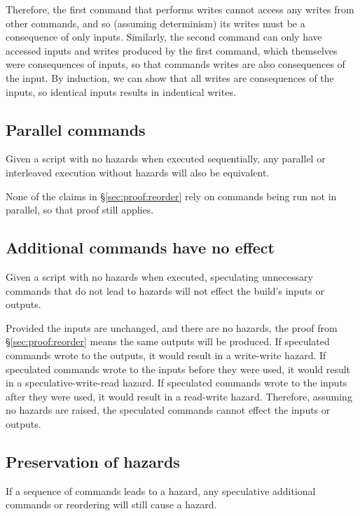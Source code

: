 Therefore, the first command that performs writes cannot access any writes from other commands, and so (assuming determinism) its writes must be a consequence of only inputs. Similarly, the second command can only have accessed inputs and writes produced by the first command, which themselves were consequences of inputs, so that commands writes are also consequences of the input. By induction, we can show that all writes are consequences of the inputs, so identical inputs results in indentical writes.

\subsection{Parallel commands}
\label{sec:proof:parallel}

\claim Given a script with no hazards when executed sequentially, any parallel or interleaved execution without hazards will also be equivalent.

\proof None of the claims in \S\ref{sec:proof:reorder} rely on commands being run not in parallel, so that proof still applies.

\subsection{Additional commands have no effect}
\label{sec:proof:additional}

\claim Given a script with no hazards when executed, speculating unnecessary commands that do not lead to hazards will not effect the build's inputs or outputs.

\proof Provided the inputs are unchanged, and there are no hazards, the proof from \S\ref{sec:proof:reorder} means the same outputs will be produced. If speculated commands wrote to the outputs, it would result in a write-write hazard. If speculated commands wrote to the inputs before they were used, it would result in a speculative-write-read hazard. If speculated commands wrote to the inputs after they were used, it would result in a read-write hazard. Therefore, assuming no hazards are raised, the speculated commands cannot effect the inputs or outputs.

\subsection{Preservation of hazards}
\label{sec:proof:keep_hazards}

\claim If a sequence of commands leads to a hazard, any speculative additional commands or reordering will still cause a hazard.

